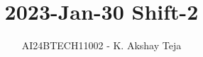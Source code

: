 \documentclass[journal,9pt,onecolumn]{IEEEtran}
\begin{document}

\vspace{3cm}

\title{2023-Jan-30 Shift-2}
\author{AI24BTECH11002 - K. Akshay Teja}
{\let\newpage\relax\maketitle}

\renewcommand{\thefigure}{\theenumi}
\renewcommand{\thetable}{\theenumi}
\setlength{\intextsep}{10pt} %

\renewcommand{\thetable}{\theenumi}
\end{document}
